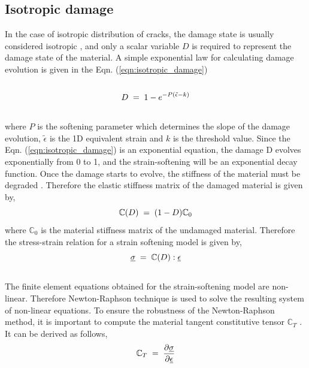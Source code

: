 \documentclass[12pt,a4paper,twoside,openright]{report}
\begin{document}
\subsection{Isotropic damage}
\indent\indent\indent In the case of isotropic distribution of cracks, the damage state is usually considered isotropic \citep{lemaitre2012course}, and only a scalar variable $D$ is required to represent the damage state of the material. A simple exponential law for calculating damage evolution is given in the Eqn. (\ref{eqn:isotropic_damage}) \citep{peerlings1999enhanced}
\\
\\
\begin{equation}
  \large{ D \; = \; 1 - e^{-P(\tilde{\epsilon} - k)}}
  \label{eqn:isotropic_damage}
\end{equation} 
\\
where $P$ is the softening parameter which determines the slope of the damage evolution, $\tilde{\epsilon}$ is the 1D equivalent strain and $k$ is the threshold value. Since the Eqn. (\ref{eqn:isotropic_damage}) is an exponential equation, the damage D evolves exponentially from 0 to 1, and the strain-softening will be an exponential decay function. Once the damage starts to evolve, the stiffness of the material must be degraded \citep{murakami2012continuum}. Therefore the elastic stiffness matrix of the damaged material is given by,\\
\begin{equation}
\large{\mathbb{C}(D) \; = \; (1  - D) \mathbb{C}_{0} }
\end{equation} 
where $\mathbb{C}_{0}$ is the material stiffness matrix of the undamaged material. Therefore the stress-strain relation for a strain softening model is given by,\\
\begin{equation}
\large{\underline{\sigma}  \; = \; \mathbb{C}(D) : \underline{ \epsilon} }  
\end{equation}
\\
The finite element equations obtained for the strain-softening model are non-linear. Therefore Newton-Raphson technique is used to solve the resulting system of non-linear equations. To ensure the robustness of the Newton-Raphson method, it is important to compute the material tangent constitutive tensor $\mathbb{C}_{T}$ \citep{lapczyk2007progressive}. It can be derived as follows,\\
\begin{equation*}
\large{ \mathbb{C}_{T}  \; = \;\frac{\partial \underline{\sigma}}{\partial \underline{ \epsilon} }  }
\end{equation*}
\end{document}
